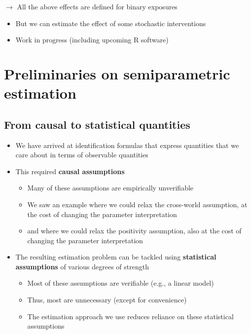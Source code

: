 \documentclass[
  12pt,
]{book}
\providecommand{\tightlist}{%
  \setlength{\itemsep}{0pt}\setlength{\parskip}{0pt}}
\theoremstyle{definition}
\theoremstyle{definition}
\theoremstyle{definition}
\newcommand{\1}{\mathbbm{1}}
\begin{document}
\(\rightarrow\) All the above effects are defined for binary exposures

\begin{itemize}
\tightlist
\item
  But we can estimate the effect of some stochastic interventions
\item
  Work in progress (including upcoming R software)
\end{itemize}

\hypertarget{preliminaries-on-semiparametric-estimation}{%
\chapter{Preliminaries on semiparametric estimation}\label{preliminaries-on-semiparametric-estimation}}

\hypertarget{from-causal-to-statistical-quantities}{%
\section{From causal to statistical quantities}\label{from-causal-to-statistical-quantities}}

\begin{itemize}
\tightlist
\item
  We have arrived at identification formulas that express quantities that we
  care about in terms of observable quantities
\item
  This required \textbf{causal assumptions}

  \begin{itemize}
  \tightlist
  \item
    Many of these assumptions are empirically unverifiable
  \item
    We saw an example where we could relax the cross-world assumption, at the
    cost of changing the parameter interpretation
  \item
    and where we could relax the positivity assumption, also at the cost of
    changing the parameter interpretation
  \end{itemize}
\item
  The resulting estimation problem can be tackled using \textbf{statistical
  assumptions} of various degrees of strength

  \begin{itemize}
  \tightlist
  \item
    Most of these assumptions are verifiable (e.g., a linear model)
  \item
    Thus, most are unnecessary (except for convenience)
  \item
    The estimation approach we use reduces reliance on these statistical
    assumptions
  \end{itemize}
\end{itemize}
\end{document}
